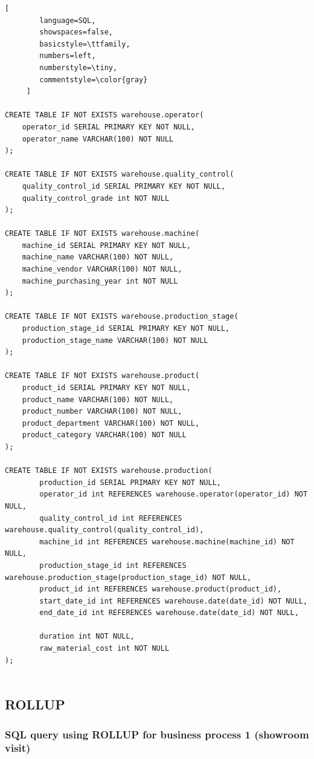 \documentclass[letterpaper,12pt]{article}
\begin{document}
\begin{lstlisting}[
        language=SQL,
        showspaces=false,
        basicstyle=\ttfamily,
        numbers=left,
        numberstyle=\tiny,
        commentstyle=\color{gray}
     ]
		
CREATE TABLE IF NOT EXISTS warehouse.operator(
  	operator_id SERIAL PRIMARY KEY NOT NULL,
  	operator_name VARCHAR(100) NOT NULL
);

CREATE TABLE IF NOT EXISTS warehouse.quality_control(
  	quality_control_id SERIAL PRIMARY KEY NOT NULL,
  	quality_control_grade int NOT NULL
);

CREATE TABLE IF NOT EXISTS warehouse.machine(
  	machine_id SERIAL PRIMARY KEY NOT NULL,
  	machine_name VARCHAR(100) NOT NULL,
  	machine_vendor VARCHAR(100) NOT NULL,
  	machine_purchasing_year int NOT NULL
);

CREATE TABLE IF NOT EXISTS warehouse.production_stage(
  	production_stage_id SERIAL PRIMARY KEY NOT NULL,
  	production_stage_name VARCHAR(100) NOT NULL
);

CREATE TABLE IF NOT EXISTS warehouse.product(
  	product_id SERIAL PRIMARY KEY NOT NULL,
  	product_name VARCHAR(100) NOT NULL,
  	product_number VARCHAR(100) NOT NULL,
  	product_department VARCHAR(100) NOT NULL,
  	product_category VARCHAR(100) NOT NULL
);

CREATE TABLE IF NOT EXISTS warehouse.production(
		production_id SERIAL PRIMARY KEY NOT NULL,
		operator_id int REFERENCES warehouse.operator(operator_id) NOT NULL,
		quality_control_id int REFERENCES warehouse.quality_control(quality_control_id),
		machine_id int REFERENCES warehouse.machine(machine_id) NOT NULL,
		production_stage_id int REFERENCES warehouse.production_stage(production_stage_id) NOT NULL,
		product_id int REFERENCES warehouse.product(product_id),
		start_date_id int REFERENCES warehouse.date(date_id) NOT NULL,
		end_date_id int REFERENCES warehouse.date(date_id) NOT NULL,
	
		duration int NOT NULL,
		raw_material_cost int NOT NULL
);		
		
\end{lstlisting}

\subsection{ROLLUP}
\subsubsection{SQL query using ROLLUP for business process 1 (showroom visit)}
\end{document}
